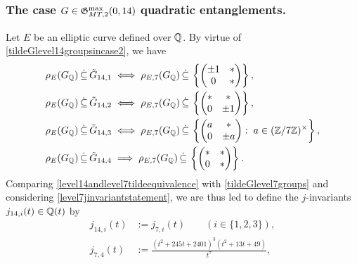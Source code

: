 \subsubsection{The case \texorpdfstring{$G \in \mathfrak{G}_{MT,2}^{\max}(0,14)$}: quadratic entanglements.}

Let $E$ be an elliptic curve defined over $\mathbb{Q}$. By virtue of \eqref{tildeGlevel14groupsincase2}, we have
\begin{equation} \label{level14andlevel7tildeequivalence}
\begin{split}
\rho_{E}(G_{\mathbb{Q}}) \, \dot\subseteq \, \tilde{G}_{14,1} \; &\Longleftrightarrow \; \rho_{E,7}(G_{\mathbb{Q}}) \, \dot\subseteq \, \left\{ \begin{pmatrix} \pm 1 & * \\ 0 & * \end{pmatrix} \right\}, \\
\rho_{E}(G_{\mathbb{Q}}) \, \dot\subseteq \, \tilde{G}_{14,2} \; &\Longleftrightarrow \; \rho_{E,7}(G_{\mathbb{Q}}) \, \dot\subseteq \, \left\{ \begin{pmatrix} * & * \\ 0 & \pm 1 \end{pmatrix} \right\}, \\
\rho_{E}(G_{\mathbb{Q}}) \, \dot\subseteq \, \tilde{G}_{14,3} \; &\Longleftrightarrow \; \rho_{E,7}(G_{\mathbb{Q}}) \, \dot\subseteq \, \left\{ \begin{pmatrix} a & * \\ 0 & \pm a \end{pmatrix} : \; a \in (\mathbb{Z}/7\mathbb{Z})^\times \right\}, \\
\rho_{E}(G_{\mathbb{Q}}) \, \dot\subseteq \, \tilde{G}_{14,4} \; &\Longrightarrow \; \rho_{E,7}(G_{\mathbb{Q}}) \, \dot\subseteq \, \left\{ \begin{pmatrix} * & * \\ 0 & * \end{pmatrix} \right\}. \\
\end{split}
\end{equation}
Comparing \eqref{level14andlevel7tildeequivalence} with \eqref{tildeGlevel7groups} and considering \eqref{level7jinvariantstatement}, we are thus led to define the $j$-invariants $j_{14,i}(t) \in \mathbb{Q}(t)$ by
\begin{equation} \label{level7jinvariantn1234}
\begin{split}
j_{14,i}(t) &:= j_{7,i}(t) \quad\quad \left( i \in \{1, 2, 3 \} \right), \\
j_{7,4}(t) &:= \frac{(t^2 + 245t + 2401)^3(t^2 + 13t + 49)}{t^7},
\end{split}
\end{equation}
